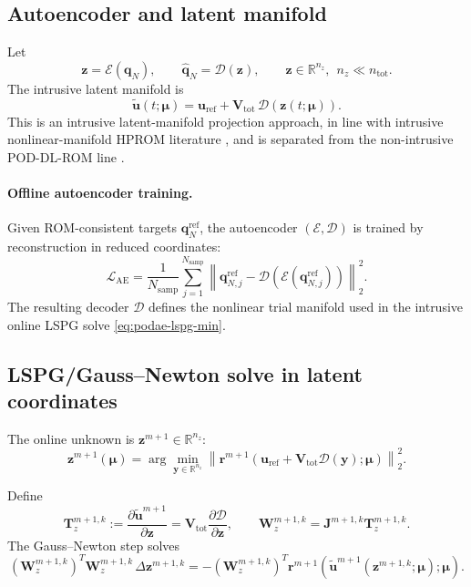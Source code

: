 \documentclass[11pt]{article}
\begin{document}
\subsection{Autoencoder and latent manifold}
Let
\begin{equation}
\mathbf z=\mathcal E(\mathbf q_N),
\qquad
\widehat{\mathbf q}_N=\mathcal D(\mathbf z),
\qquad
\mathbf z\in\mathbb R^{n_z},\ \ n_z\ll n_{\mathrm{tot}}.
\end{equation}
The intrusive latent manifold is
\begin{equation}
\tilde{\mathbf u}(t;\bm\mu)
=
\mathbf u_{\mathrm{ref}}+\mathbf V_{\mathrm{tot}}\,\mathcal D(\mathbf z(t;\bm\mu)).
\label{eq:podae-manifold}
\end{equation}
This is an intrusive latent-manifold projection approach, in line with intrusive nonlinear-manifold HPROM literature \cite{romor2025explicable}, and is separated from the non-intrusive POD-DL-ROM line \cite{fresca2022pod}.

\paragraph{Offline autoencoder training.}
Given ROM-consistent targets $\mathbf q_N^{\mathrm{ref}}$, the autoencoder
$(\mathcal E,\mathcal D)$ is trained by reconstruction in reduced coordinates:
\begin{equation}
\mathcal L_{\mathrm{AE}}
=
\frac{1}{N_{\mathrm{samp}}}
\sum_{j=1}^{N_{\mathrm{samp}}}
\left\|
\mathbf q_{N,j}^{\mathrm{ref}}
-
\mathcal D\!\left(\mathcal E(\mathbf q_{N,j}^{\mathrm{ref}})\right)
\right\|_2^2.
\end{equation}
The resulting decoder $\mathcal D$ defines the nonlinear trial manifold used in
the intrusive online LSPG solve \eqref{eq:podae-lspg-min}.

\subsection{LSPG/Gauss--Newton solve in latent coordinates}
The online unknown is $\mathbf z^{m+1}\in\mathbb R^{n_z}$:
\begin{equation}
\mathbf z^{m+1}(\bm\mu)
=
\arg\min_{\mathbf y\in\mathbb R^{n_z}}
\left\|
\mathbf r^{m+1}(\mathbf u_{\mathrm{ref}}+\mathbf V_{\mathrm{tot}}\mathcal D(\mathbf y);\bm\mu)
\right\|_2^2.
\label{eq:podae-lspg-min}
\end{equation}

Define
\begin{equation}
\mathbf T_z^{m+1,k}:=\frac{\partial\tilde{\mathbf u}^{m+1}}{\partial\mathbf z}
=\mathbf V_{\mathrm{tot}}\frac{\partial\mathcal D}{\partial\mathbf z},
\qquad
\mathbf W_z^{m+1,k}=\mathbf J^{m+1,k}\mathbf T_z^{m+1,k}.
\end{equation}
The Gauss--Newton step solves
\begin{equation}
(\mathbf W_z^{m+1,k})^T\mathbf W_z^{m+1,k}\,\Delta\mathbf z^{m+1,k}
=
-(\mathbf W_z^{m+1,k})^T
\mathbf r^{m+1}(\tilde{\mathbf u}^{m+1}(\mathbf z^{m+1,k};\bm\mu);\bm\mu).
\end{equation}
\end{document}
